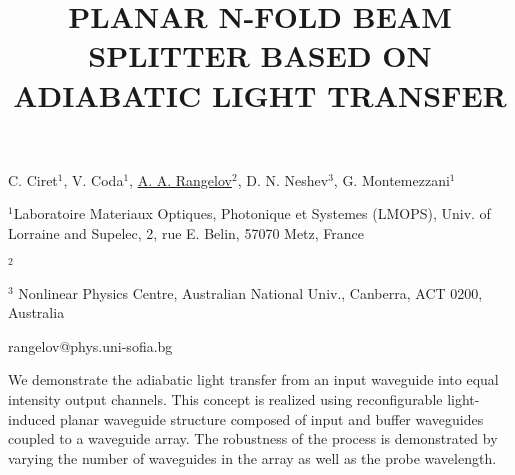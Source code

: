 \title{PLANAR N-FOLD BEAM SPLITTER BASED ON ADIABATIC LIGHT TRANSFER}

C. Ciret$^{1}$, V. Coda$^{1}$, \underline{A. A. Rangelov}$^{2}$,
D. N. Neshev$^{3}$, G. Montemezzani$^{1}$    

{\normalsize{

\vspace{-4mm} $^1$Laboratoire Materiaux Optiques, Photonique et
Systemes (LMOPS), Univ. of Lorraine and Supelec, 2, rue E. Belin,
57070 Metz, France

\vspace{-4mm} $^2$ \unisofia

\vspace{-4mm} $^3$ Nonlinear Physics Centre, Australian National
Univ., Canberra, ACT 0200, Australia

\email rangelov@phys.uni-sofia.bg}}

We demonstrate the adiabatic light transfer from an input
waveguide into equal intensity output channels. This  concept is
realized using reconfigurable light-induced planar waveguide
structure composed of input and buffer waveguides coupled to a
waveguide array. The robustness of the process is demonstrated by
varying the number of waveguides in the array as well as the probe
wavelength.

\vspace{\baselineskip}
